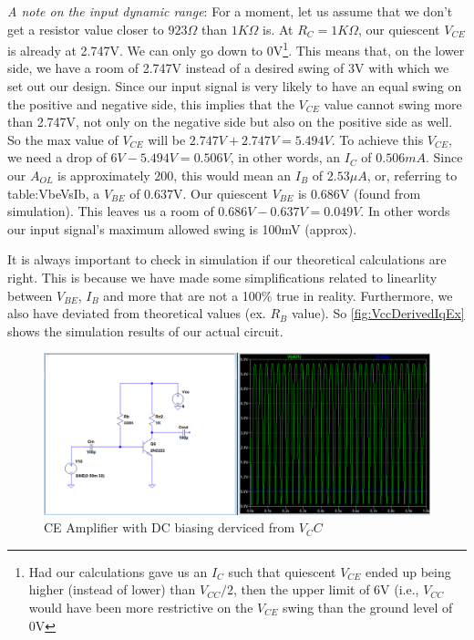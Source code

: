 \emph{A note on the input dynamic range}: For a moment, let us assume that we don't get a resistor value closer to $923\Omega$ than $1K\Omega$ is. At $R_C = 1K\Omega$, our quiescent $V_{CE}$ is already at 2.747V. We can only go down to 0V\footnote{Had our calculations gave us an $I_C$ such that quiescent $V_{CE}$ ended up being higher (instead of lower) than $V_{CC}/2$, then the upper limit of 6V (i.e., $V_{CC}$ would have been more restrictive on the $V_{CE}$ swing than the ground level of 0V}. This means that, on the lower side, we have a room of 2.747V instead of a desired swing of 3V with which we set out our design. Since our input signal is very likely to have an equal swing on the positive and negative side, this implies that the $V_{CE}$ value cannot swing more than 2.747V, not only on the negative side but also on the positive side as well. So the max value of $V_{CE}$ will be $2.747V + 2.747V = 5.494V$. To achieve this $V_{CE}$, we need a drop of $6V - 5.494V = 0.506V$, in other words, an $I_C$ of $0.506 mA$. Since our $A_{OL}$ is approximately 200, this would mean an $I_B$ of $2.53\mu A$, or, referring to {table:VbeVsIb}, a $V_{BE}$ of 0.637V. Our quiescent $V_{BE}$ is 0.686V (found from simulation). This leaves us a room of $0.686V - 0.637V = 0.049V$. In other words our input signal's maximum allowed swing is 100mV (approx).

It is always important to check in simulation if our theoretical calculations are right. This is because we have made some simplifications related to linearlity between $V_{BE}$, $I_B$ and more that are not a 100\% true in reality. Furthermore, we also have deviated from theoretical values (ex. $R_B$ value). So \autoref{fig:VccDerivedIqEx} shows the simulation results of our actual circuit.

	\begin{figure}[h!]
	\centering
	\includegraphics[width = \textwidth]{partHW/VccDerivedIq}
	\caption{CE Amplifier with DC biasing derviced from $V_CC$}
	\label{fig:VccDerivedIqEx}
	\end{figure}

